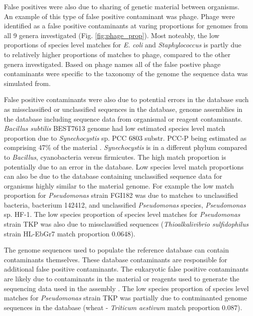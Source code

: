 \documentclass[fleqn,10pt,lineno]{wlpeerj}\usepackage[]{graphicx}\usepackage[]{color}
\begin{document}
False positives were also due to sharing of genetic material between organisms. An example of this type of false positive contaminant was phage. Phage were identified as a false positive contaminants at varing proportions for genomes from all 9 genera investigated (Fig. \ref{fig:phage_prop}). 
Most noteably, the low proportions of species level matches for \textit{E. coli} and \textit{Staphylococcus} is partly due to relatively higher proportions of matches to phage, compared to the other genera investigated. 
Based on phage names all of the false postive phage contaminants were specific to the taxonomy of the genome the sequence data was simulated from. 

False positive contaminants were also due to potential errors in the database such as missclassified or unclassified sequences in the database, genome assemblies in the database including sequence data from organismal or reagent contaminants. 
\textit{Bacillus subtilis} BEST7613 genome had low estimated species level match proportion due to \textit{Synechocystis} sp. PCC 6803 substr. PCC-P being estimated as comprising 47\% of the material  \citep{kanesaki2012identification}. \textit{Synechocystis} is in a different phylum compared to \textit{Bacillus}, cyanobacteria versus firmicutes. 
The high match proportion is potentially due to an error in the database. 
Low species level match proportions can also be due to the database containing unclassified sequence data for organisms highly similar to the material genome. 
For example the low match proportion for \textit{Pseudomonas} strain FGI182 was due to matches to unclassified bacteria, bacterium 142412, and unclassified \textit{Pseudomonas} species, \textit{Pseudomonas} sp. HF-1. 
The low species proportion of species level matches for \textit{Pseudomonas} strain TKP was also due to missclassified sequences (\textit{Thioalkalivibrio sulfidophilus} strain HL-EbGr7 match proportion 0.0648).

The genome sequences used to populate the reference database can contain contaminants themselves. 
These database contaminants are responsible for additional false positive contaminants.
The eukaryotic false positive contaminants are likely due to contaminants in the material or reagents used to generate the sequencing data used in the assembly \citep{parks2015checkm}. 
The low species proportion of species level matches for \textit{Pseudomonas} strain TKP was partially due to contminanted genome sequences in the database (wheat - \textit{Triticum aestivum} match proportion 0.087). 
\end{document}

